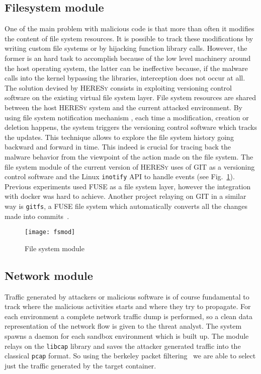\subsection{Filesystem module}
\label{sub:fs}
One of the main problem with malicious code is that more than often it modifies the content of file system resources. It is possible to track these modifications by writing custom file systems or by hijacking function library calls. However, the former is an hard task to accomplish because of the low level machinery around the host operating system, the latter can be ineffective because, if the malware calls into the kernel bypassing the libraries,  interception does not occur at all. 
The  solution devised by \textsc{HERESy} consists in exploiting versioning control software on the existing virtual file system layer. File system resources are shared between the host \textsc{HERESy} system and the current attacked environment. By
 using file system notification mechanism \cite{fsnotify}, each time a modification,  creation or deletion happens, the system triggers the versioning control software which tracks the updates.
This technique allows  to  explore the file system history going backward and forward in time. This indeed is crucial for tracing back the malware behavior from the viewpoint of the action made on the file system.  
The file system module of the current version of \textsc{HERESy}  uses of GIT as a versioning control software and the Linux \texttt{inotify} API to handle events \cite{fsnotify} (see Fig.~\ref{fig:fsmod}). Previous experiments used FUSE \cite{fuse} as a file system layer, however the integration with docker was hard to achieve. Another project relaying on GIT in a similar way is \texttt{gitfs}, a FUSE file system which automatically converts all the changes made into commits~\cite{gitfs}.

\begin{figure}[bt]

\centering
	  \texttt{[image: fsmod]}
\caption{ File system module}
\label{fig:fsmod}
\end{figure}


\subsection{Network module}
\label{sub:net}

Traffic generated by attackers or malicious software is of course fundamental to track where the malicious activities starts and where they try to propagate. For each environment a complete network traffic dump is performed, so a clean data representation of the network flow is given to the threat analyst. The system spawns a daemon for each sandbox environment which is built up. The module relays on the \texttt{libcap} library and saves the attacker generated traffic into the classical \texttt{pcap} format. So using the berkeley packet filtering~\cite{McCanne1993} we are able to select just the traffic generated by the target container.


